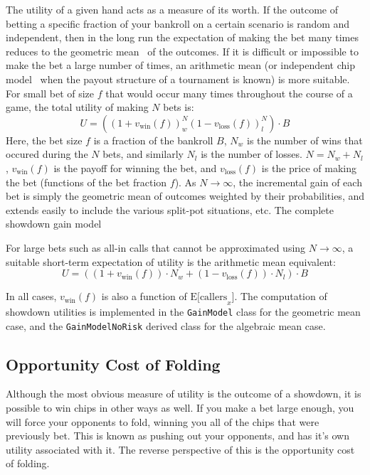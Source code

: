 The utility of a given hand acts as a measure of its worth.
If the outcome of betting a specific fraction of your bankroll on a certain scenario is random and independent, then in the long run the expectation of making the bet many times reduces to the geometric mean~\cite{KellyCriterion} of the outcomes.
If it is difficult or impossible to make the bet a large number of times, an arithmetic mean (or independent chip model~\cite{ICMmag2007} when the payout structure of a tournament is known) is more suitable.
For small bet of size $f$ that would occur many times throughout the course of a game, the total utility of making $N$ bets is:
\[
U = \left( \left( 1 + v_\mathrm{win} \left( f \right) \right)^N_w \left( 1 - v_\mathrm{loss} \left( f \right) \right)^N_l \right) \cdot B
\]
Here, the bet size $f$ is a fraction of the bankroll $B$, $N_w$ is the number of wins that occured during the $N$ bets, and similarly $N_l$ is the number of losses.
$N = N_w + N_l$, $v_\mathrm{win} \left( f \right)$ is the payoff for winning the bet, and $v_\mathrm{loss} \left( f \right)$ is the price of making the bet (functions of the bet fraction $f$).
As $N \to \infty$, the incremental gain of each bet is simply the geometric mean of outcomes weighted by their probabilities, and extends easily to include the various split-pot situations, etc.
The complete showdown gain model 

For large bets such as all-in calls that cannot be approximated using $N \to \infty$, a suitable short-term expectation of utility is the arithmetic mean equivalent:
\[
U = \left( \left( 1 + v_\mathrm{win} \left( f \right) \right) \cdot N_w + \left( 1 - v_\mathrm{loss} \left( f \right) \right) \cdot N_l \right) \cdot B
\]

In all cases, $v_\mathrm{win} \left( f \right)$ is also a function of $\mathrm{E[callers}_x]$.
The computation of showdown utilities is implemented in the \texttt{GainModel} class for the geometric mean case, and the \texttt{GainModelNoRisk} derived class for the algebraic mean case.



\subsection{Opportunity Cost of Folding}
\label{sec:FoldEquity}
Although the most obvious measure of utility is the outcome of a showdown, it is possible to win chips in other ways as well.
If you make a bet large enough, you will force your opponents to fold, winning you all of the chips that were previously bet.
This is known as pushing out your opponents, and has it's own utility associated with it.
The reverse perspective of this is the opportunity cost of folding.


